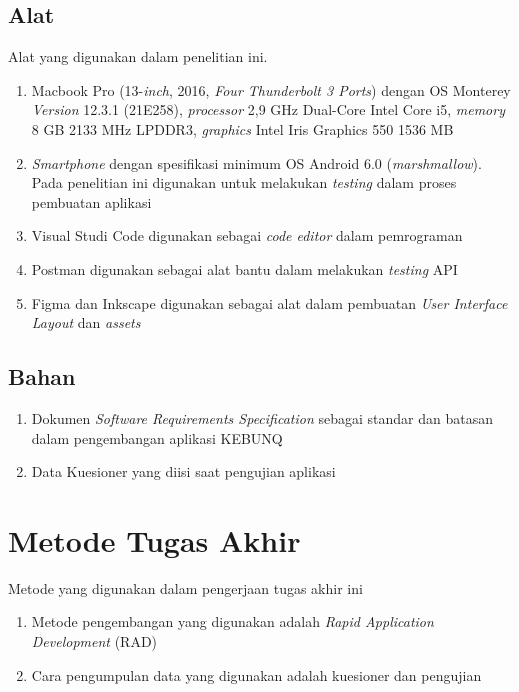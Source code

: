 \begin{flushleft}
\begin{justify}
         \subsection{Alat}
         Alat yang digunakan dalam penelitian ini.
         \begin{enumerate}
            \item Macbook Pro (13-\textit{inch}, 2016, \textit{Four Thunderbolt 3 Ports}) dengan OS Monterey \textit{Version} 12.3.1 (21E258), \textit{processor} 2,9 GHz Dual-Core Intel Core i5, \textit{memory} 8 GB 2133 MHz LPDDR3, \textit{graphics} Intel Iris Graphics 550 1536 MB
            \item \textit{Smartphone} dengan spesifikasi minimum OS Android 6.0 (\textit{marshmallow}). Pada penelitian ini digunakan untuk melakukan \textit{testing} dalam proses pembuatan aplikasi
            \item Visual Studi Code digunakan sebagai \textit{code editor} dalam pemrograman
            \item Postman digunakan sebagai alat bantu dalam melakukan \textit{testing} API
            \item Figma dan Inkscape digunakan sebagai alat dalam pembuatan \textit{User Interface Layout} dan \textit{assets}\\
         \end{enumerate}
         \subsection{Bahan}
         \begin{enumerate}
            \item Dokumen \textit{Software Requirements Specification} sebagai standar dan batasan dalam pengembangan aplikasi KEBUNQ
            \item Data Kuesioner yang diisi saat pengujian aplikasi\\
         \end{enumerate}
      \section{Metode Tugas Akhir}
      Metode yang digunakan dalam pengerjaan tugas akhir ini
      \begin{enumerate}
         \item Metode pengembangan yang digunakan adalah \textit{Rapid Application Development} (RAD)
         \item Cara pengumpulan data yang digunakan adalah kuesioner dan pengujian\\
      \end{enumerate}


\end{justify}
\end{flushleft}

